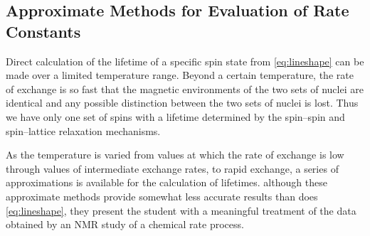
\subsection{Approximate Methods for Evaluation of Rate Constants\autocite{johnson65}} %
\label{sub:approximate_methods_for_evaluation_of_rate_constants_autocite_johnson66}

Direct calculation of the lifetime of a specific spin state from \cref{eq:lineshape} can be made over a limited temperature range.  
Beyond a certain temperature, the rate of exchange is so fast that the magnetic environments of the two sets of nuclei are identical and any possible distinction between the two sets of nuclei is lost. 
Thus we have only one set of spins with a lifetime determined by the spin--spin and spin--lattice relaxation mechanisms. 

As the temperature is varied from values at which the rate of exchange is low through values of intermediate exchange rates, to rapid exchange, a series of approximations is available for the calculation of lifetimes.
although these approximate methods provide somewhat less accurate results than does \cref{eq:lineshape}, they present the student with a meaningful treatment of the data obtained by an NMR study of a chemical rate process. 

